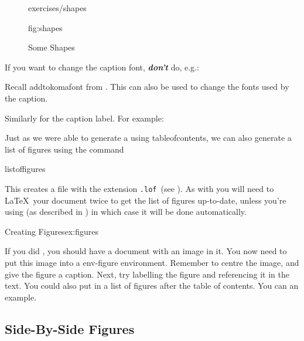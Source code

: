 \begin{figure}[hbtp]
\figconts
  {exercises/shapes}
  {%
    \caption{Some Shapes}%
  }%
  {fig:shapes}
\end{figure}


If you want to change the caption font, \textbf{\em don't} do, e.g.:
\begin{alltt}
\wrong{}
\end{alltt}
Recall \gls{addtokomafont} from . This can
also be used to change the fonts used by the caption.\bookpagebreak
\begin{alltt}
\correct{}
\end{alltt}
Similarly for the caption label. For example:
\begin{codeS}
\end{codeS}


Just as we were able to generate a  using \gls{tableofcontents}, we can also
generate a list of figures using the command
\begin{definition}
\gls{listoffigures}
\end{definition}
This creates a file with the extension \texttt{.lof}\indexLOF\ (see
).
As with \reportlinebreak{} you will need to \LaTeX\ your document twice to
get the list of figures up-to-date, unless
you're using  (as described in
) in which case it will be done
automatically.

\begin{exercise}{Creating Figures}{ex:figures}

If you did , you should have a document
with an image in it. You now need to put this image into a
\gls{env-figure} environment. Remember to centre the image, and give
the figure a caption. Next, try labelling the figure and referencing
it in the text. You could also put in a list of figures after the
table of contents.
You can  an example.

\end{exercise}

\subsection{Side-By-Side Figures}
\label{sec:sidebysidefigs}

